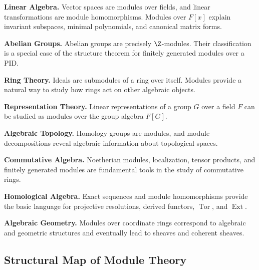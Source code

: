 \begin{applicationbox}
\textbf{Linear Algebra.}
Vector spaces are modules over fields, and linear transformations are module
homomorphisms. Modules over \(F[x]\) explain invariant subspaces, minimal
polynomials, and canonical matrix forms.

\medskip

\textbf{Abelian Groups.}
Abelian groups are precisely \(\Z\)-modules. Their classification is a
special case of the structure theorem for finitely generated modules over a
PID.

\medskip

\textbf{Ring Theory.}
Ideals are submodules of a ring over itself. Modules provide a natural way to
study how rings act on other algebraic objects.

\medskip

\textbf{Representation Theory.}
Linear representations of a group \(G\) over a field \(F\) can be studied as
modules over the group algebra \(F[G]\).

\medskip

\textbf{Algebraic Topology.}
Homology groups are modules, and module decompositions reveal algebraic
information about topological spaces.

\medskip

\textbf{Commutative Algebra.}
Noetherian modules, localization, tensor products, and finitely generated
modules are fundamental tools in the study of commutative rings.

\medskip

\textbf{Homological Algebra.}
Exact sequences and module homomorphisms provide the basic language for
projective resolutions, derived functors, \(\operatorname{Tor}\), and
\(\operatorname{Ext}\).

\medskip

\textbf{Algebraic Geometry.}
Modules over coordinate rings correspond to algebraic and geometric
structures and eventually lead to sheaves and coherent sheaves.
\end{applicationbox}

\subsection{Structural Map of Module Theory}
\label{subsec:module-theory-structural-map}

